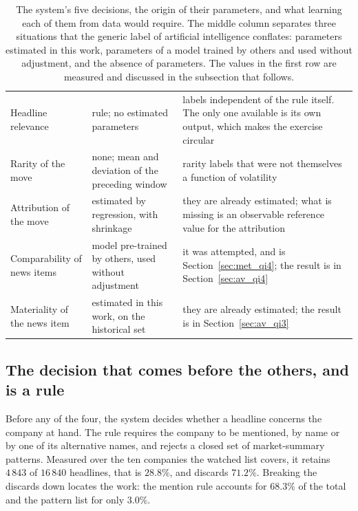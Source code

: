 \begin{table}[!htbp]
\caption[Where learning enters, decision by decision]{The system's five decisions, the origin of
their parameters, and what learning each of them from data would require. The middle column
separates three situations that the generic label of artificial intelligence conflates:
parameters estimated in this work, parameters of a model trained by others and used without
adjustment, and the absence of parameters. The values in the first row are measured and discussed in the
subsection that follows.}
\label{tab:met_onde_ia}
\centering
\small
\begin{tabular}{L{0.20\textwidth} L{0.24\textwidth} L{0.44\textwidth}}
\toprule
{} &  &  \\
\midrule
Headline relevance & rule; no estimated parameters & labels independent of the rule itself. The
only one available is its own output, which makes the exercise circular \\
\addlinespace
Rarity of the move & none; mean and deviation of the preceding window & rarity labels that were
not themselves a function of volatility \\
\addlinespace
Attribution of the move & estimated by regression, with shrinkage & they are already estimated;
what is missing is an observable reference value for the attribution \\
\addlinespace
Comparability of news items & model pre-trained by others, used without adjustment & it was
attempted, and is Section~\ref{sec:met_qi4}; the result is in Section~\ref{sec:av_qi4} \\
\addlinespace
Materiality of the news item & estimated in this work, on the historical set & they are already
estimated; the result is in Section~\ref{sec:av_qi3} \\
\bottomrule
\end{tabular}
\end{table}

\subsection*{The decision that comes before the others, and is a rule}
\label{sec:met_relevancia_nota}

Before any of the four, the system decides whether a headline concerns the company at hand. The
rule requires the company to be mentioned, by name or by one of its alternative names, and
rejects a closed set of market-summary patterns. Measured over the ten companies the watched
list covers, it retains $4\,843$ of $16\,840$ headlines, that is $28.8\%$, and discards
$71.2\%$. Breaking the discards down locates the work: the mention rule accounts for $68.3\%$
of the total and the pattern list for only $3.0\%$.

